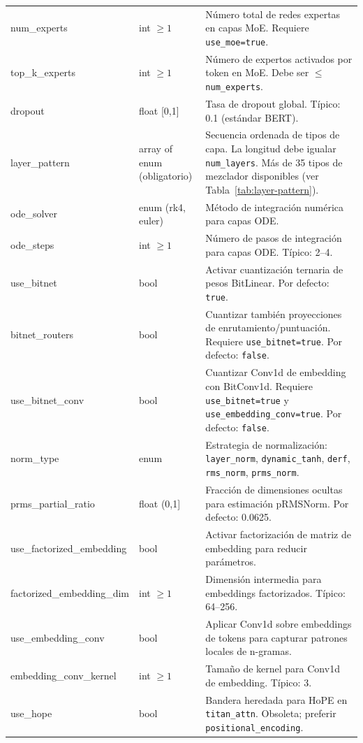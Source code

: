 \begin{longtable}{>{\ttfamily}l>{\raggedright\arraybackslash}p{3.5cm}>{\raggedright\arraybackslash}p{8.5cm}}
num\_experts & int $\ge 1$ & Número total de redes expertas en capas MoE. Requiere \texttt{use\_moe=true}. \\
top\_k\_experts & int $\ge 1$ & Número de expertos activados por token en MoE. Debe ser $\le$ \texttt{num\_experts}. \\
dropout & float [0,1] & Tasa de dropout global. Típico: 0.1 (estándar BERT). \\
layer\_pattern & array of enum (obligatorio) & Secuencia ordenada de tipos de capa. La longitud debe igualar \texttt{num\_layers}. Más de 35 tipos de mezclador disponibles (ver Tabla~\ref{tab:layer-pattern}). \\
ode\_solver & enum (rk4, euler) & Método de integración numérica para capas ODE. \\
ode\_steps & int $\ge 1$ & Número de pasos de integración para capas ODE. Típico: 2--4. \\
use\_bitnet & bool & Activar cuantización ternaria de pesos BitLinear. Por defecto: \texttt{true}. \\
bitnet\_routers & bool & Cuantizar también proyecciones de enrutamiento/puntuación. Requiere \texttt{use\_bitnet=true}. Por defecto: \texttt{false}. \\
use\_bitnet\_conv & bool & Cuantizar Conv1d de embedding con BitConv1d. Requiere \texttt{use\_bitnet=true} y \texttt{use\_embedding\_conv=true}. Por defecto: \texttt{false}. \\
norm\_type & enum & Estrategia de normalización: \texttt{layer\_norm}, \texttt{dynamic\_tanh}, \texttt{derf}, \texttt{rms\_norm}, \texttt{prms\_norm}. \\
prms\_partial\_ratio & float (0,1] & Fracción de dimensiones ocultas para estimación pRMSNorm. Por defecto: 0.0625. \\
use\_factorized\_embedding & bool & Activar factorización de matriz de embedding para reducir parámetros. \\
factorized\_embedding\_dim & int $\ge 1$ & Dimensión intermedia para embeddings factorizados. Típico: 64--256. \\
use\_embedding\_conv & bool & Aplicar Conv1d sobre embeddings de tokens para capturar patrones locales de n-gramas. \\
embedding\_conv\_kernel & int $\ge 1$ & Tamaño de kernel para Conv1d de embedding. Típico: 3. \\
use\_hope & bool & Bandera heredada para HoPE en \texttt{titan\_attn}. Obsoleta; preferir \texttt{positional\_encoding}. \\

\end{longtable}
